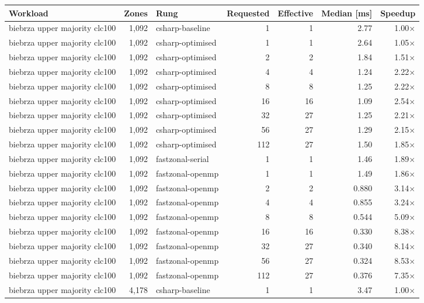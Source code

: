 \begin{tabular}{lrlrrrr}
\toprule
Workload & Zones & Rung & Requested & Effective & Median [ms] & Speedup \\
\midrule
biebrza upper majority clc100 & 1,092 & csharp-baseline & 1 & 1 & 2.77 & 1.00$\times$ \\
biebrza upper majority clc100 & 1,092 & csharp-optimised & 1 & 1 & 2.64 & 1.05$\times$ \\
biebrza upper majority clc100 & 1,092 & csharp-optimised & 2 & 2 & 1.84 & 1.51$\times$ \\
biebrza upper majority clc100 & 1,092 & csharp-optimised & 4 & 4 & 1.24 & 2.22$\times$ \\
biebrza upper majority clc100 & 1,092 & csharp-optimised & 8 & 8 & 1.25 & 2.22$\times$ \\
biebrza upper majority clc100 & 1,092 & csharp-optimised & 16 & 16 & 1.09 & 2.54$\times$ \\
biebrza upper majority clc100 & 1,092 & csharp-optimised & 32 & 27 & 1.25 & 2.21$\times$ \\
biebrza upper majority clc100 & 1,092 & csharp-optimised & 56 & 27 & 1.29 & 2.15$\times$ \\
biebrza upper majority clc100 & 1,092 & csharp-optimised & 112 & 27 & 1.50 & 1.85$\times$ \\
biebrza upper majority clc100 & 1,092 & fastzonal-serial & 1 & 1 & 1.46 & 1.89$\times$ \\
biebrza upper majority clc100 & 1,092 & fastzonal-openmp & 1 & 1 & 1.49 & 1.86$\times$ \\
biebrza upper majority clc100 & 1,092 & fastzonal-openmp & 2 & 2 & 0.880 & 3.14$\times$ \\
biebrza upper majority clc100 & 1,092 & fastzonal-openmp & 4 & 4 & 0.855 & 3.24$\times$ \\
biebrza upper majority clc100 & 1,092 & fastzonal-openmp & 8 & 8 & 0.544 & 5.09$\times$ \\
biebrza upper majority clc100 & 1,092 & fastzonal-openmp & 16 & 16 & 0.330 & 8.38$\times$ \\
biebrza upper majority clc100 & 1,092 & fastzonal-openmp & 32 & 27 & 0.340 & 8.14$\times$ \\
biebrza upper majority clc100 & 1,092 & fastzonal-openmp & 56 & 27 & 0.324 & 8.53$\times$ \\
biebrza upper majority clc100 & 1,092 & fastzonal-openmp & 112 & 27 & 0.376 & 7.35$\times$ \\
biebrza upper majority clc100 & 4,178 & csharp-baseline & 1 & 1 & 3.47 & 1.00$\times$ \\

\end{tabular}

